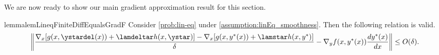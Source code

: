 








We are now ready to show our main gradient approximation result for this section. 
\begin{restatable}{lemma}{lemLineqFiniteDiffEqualsGradF}\label{lem:lineq-finitediff-equals-gradf} Consider  \cref{prob:lin-eq} under \cref{assumption:linEq_smoothness}. 
Then the
following relation is valid.
\[
\left\|\frac{\nabla_{x}[g(x,\ystardel(x))+\lamdeltar h(x,\ystar)]-\nabla_{x}[g(x,y^{*}(x))+\lamstar h(x,y^{*})]}{\delta}-\nabla_{y}f(x,y^{*}(x))\frac{d y^{*}(x)}{d x}\right\|\leq O(\delta).
\]
\end{restatable}





